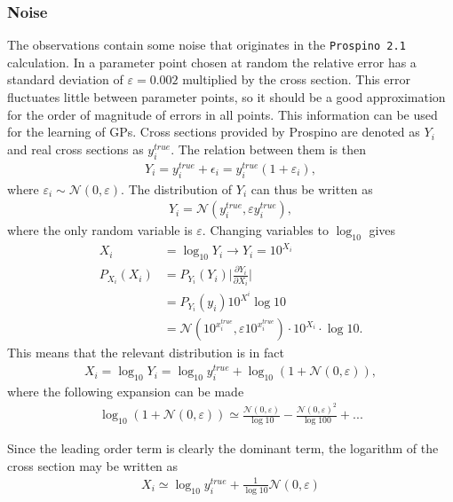 \documentclass[twoside,english]{uiofysmaster}
\begin{document}
\subsubsection{Noise}

The observations contain some noise that originates in the \verb|Prospino 2.1| calculation. In a parameter point chosen at random the relative error has a standard deviation of $\varepsilon = 0.002$ multiplied by the cross section. This error fluctuates little between parameter points, so it should be a good approximation for the order of magnitude of errors in all points. This information can be used for the learning of GPs. Cross sections provided by Prospino are denoted as $Y_i$ and real cross sections as $y_i^{true}$. The relation between them is then
\begin{align}\label{Eq:: cross section w/ error}
Y_i = y^{true}_i + \epsilon_i = y_i^{true}(1 + \varepsilon_i),
\end{align}
where $\varepsilon_i \sim \mathcal{N}(0, \varepsilon)$. The distribution of $Y_i$ can thus be written as 
\begin{align}
Y_i = \mathcal{N}(y_i^{true}, \varepsilon y_i^{true}),
\end{align}
where the only random variable is $\varepsilon$. Changing variables to $\log_{10}$ gives
\begin{align}
X_i &= \log_{10} Y_i \rightarrow Y_i = 10^{X_i}\\
P_{X_i} (X_i) &= P_{Y_i} (Y_i) \Big|\frac{\partial Y_i}{\partial X_i}\Big|\\
&= P_{Y_i} (y_i) 10^{X^i} \log 10\\
&= \mathcal{N} (10^{x_i^{true}}, \varepsilon 10^{x_i^{true}}) \cdot 10^{X_i} \cdot \log 10.
\end{align}
This means that the relevant distribution is in fact
\begin{align*}
X_i = \log_{10} Y_i = \log_{10} y_i^{true} + \log_{10} (1 + \mathcal{N}(0, \varepsilon)),
\end{align*}
where the following expansion can be made
\begin{align}
\log_{10} (1 + \mathcal{N}(0, \varepsilon)) \simeq \frac{\mathcal{N} (0, \varepsilon)}{\log 10} - \frac{\mathcal{N} (0, \varepsilon)^2}{\log 100} +...
\end{align}

Since the leading order term is clearly the dominant term, the logarithm of the cross section may be written as
\begin{align}\label{Eq:: cross section log gaussian noise}
X_i \simeq \log_{10} y_i^{true} + \frac{1}{\log 10} \mathcal{N} (0, \varepsilon)
\end{align}
\end{document}
